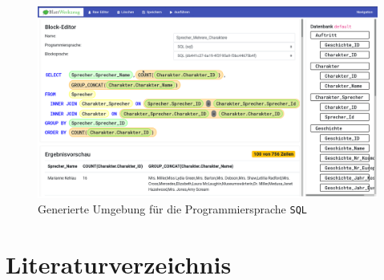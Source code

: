 \documentclass[paper=a4,fontsize=12pt,parskip=half]{scrartcl}
\begin{document}
\begin{figure}[p]
  \includegraphics[width=\linewidth]{screenshot-drag-drop-ide.png}
  \caption{Generierte Umgebung für die Programmiersprache \texttt{SQL}}
  \label{fig:example-sql-ide}
\end{figure}


\section*{Literaturverzeichnis}
\printbibliography[heading=none]
\end{document}
